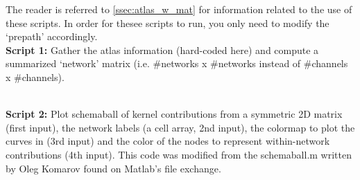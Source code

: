 The reader is referred to \ref{ssec:atlas_w_mat} for information related to the use of these scripts. In order for thesee scripts to run, you only need to modify the `prepath' accordingly.
\\

\textbf{Script 1:} Gather the atlas information (hard-coded here) and compute a summarized `network' matrix (i.e. \#networks x \#networks instead of \#channels x \#channels).
\\

  \

\textbf{Script 2:} Plot schemaball of kernel contributions from a symmetric 2D matrix (first input), the network labels (a cell array, 2nd input), the colormap to plot the curves in (3rd input) and the color of the nodes to represent within-network contributions (4th input). This code was modified from the schemaball.m written by Oleg Komarov found on Matlab’s file exchange.
\\

































